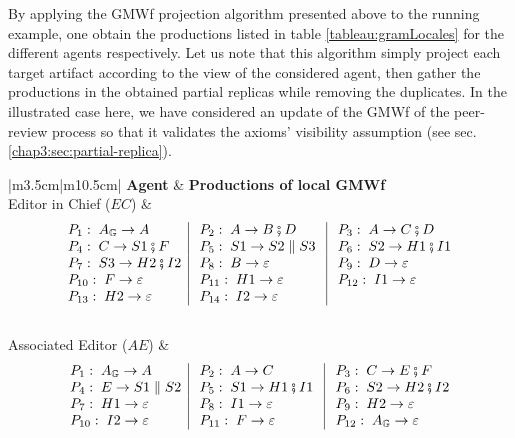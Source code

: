 By applying the GMWf projection algorithm presented above to the running example, one obtain the productions listed in table \ref{tableau:gramLocales} for the different agents respectively. Let us note that this algorithm simply project each target artifact according to the view of the considered agent, then gather the productions in the obtained partial replicas while removing the duplicates. In the illustrated case here, we have considered an update of the GMWf of the peer-review process so that it validates the axioms' visibility assumption (see sec. \ref{chap3:sec:partial-replica}).
\begin{table}[h]
	\centering
	\caption{Local GMWf productions of all the agents involved in the peer-review process.}
	\label{tableau:gramLocales}
	\begin{tabular}[t]{|m{3.5cm}|m{10.5cm}|}
		\hline
		\textbf{Agent} & \textbf{Productions of local GMWf} \\
		\hline
		Editor in Chief ($EC$) &
		\[ 
		\begin{array}{l|l|l}
		P_{1}:\; A_{\mathbb{G}}\rightarrow A & \; P_{2}:\; A\rightarrow B\fatsemi D\; & \; P_{3}:\; A\rightarrow C\fatsemi D  \\
		P_{4}:\; C\rightarrow S1\fatsemi F & \; P_{5}:\; S1\rightarrow S2\parallel S3\; & \; P_{6}:\; S2\rightarrow H1 \fatsemi I1  \\
		P_{7}:\; S3\rightarrow H2 \fatsemi I2 & \; P_{8}:\; B\rightarrow \varepsilon\; & \; P_{9}:\; D\rightarrow \varepsilon \\
		P_{10}:\; F\rightarrow \varepsilon & \; P_{11}:\; H1\rightarrow \varepsilon\; & \; P_{12}:\; I1\rightarrow \varepsilon  \\
		P_{13}:\; H2\rightarrow \varepsilon & \; P_{14}:\; I2\rightarrow \varepsilon \; &   \\
		\end{array}
		\]
		\\
		\hline
		Associated Editor ($AE$) & 
		\[ 
		\begin{array}{l|l|l}
		P_{1}:\; A_{\mathbb{G}}\rightarrow A & \; P_{2}:\; A\rightarrow C \; & \; P_{3}:\; C\rightarrow E\fatsemi F  \\
		P_{4}:\; E\rightarrow S1\parallel S2 & \; P_{5}:\; S1\rightarrow H1\fatsemi I1 \; & \; P_{6}:\; S2\rightarrow H2\fatsemi I2  \\
		P_{7}:\; H1\rightarrow \varepsilon & \; P_{8}:\; I1\rightarrow \varepsilon \; & \; P_{9}:\; H2\rightarrow \varepsilon \\
		P_{10}:\; I2\rightarrow \varepsilon & \; P_{11}:\; F\rightarrow \varepsilon \; & \; P_{12}:\; A_{\mathbb{G}}\rightarrow \varepsilon \\

\end{array}\]
\end{tabular}
\end{table}
